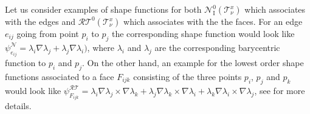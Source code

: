 \documentclass[a4paper,11pt]{article}
\begin{document}
 {Let us consider examples of shape functions for both $\mathcal N_\mathrm{I}^0(\mathcal T^x_\nu)$ which associates with the edges and $\mathcal{RT}^0(\mathcal T^x_\nu)$ which associates with the the faces. For an edge $e_{ij}$ going from point $p_i$ to $p_j$ the corresponding shape function would look like $\psi^{\mathcal{N}}_{e_{ij}} = \lambda_i\nabla \lambda_j+\lambda_j\nabla \lambda_i)$, where $\lambda_i$ and $\lambda_j$ are the corresponding barycentric function to $p_i$ and $p_j$. On the other hand, an example for the lowest order shape functions associated to a face $F_{ijk}$ consisting of the three points $p_i$, $p_j$ and $p_k$ would look like $\psi_{F_{ijk}}^{\mathcal{RT}}=\lambda_i\nabla \lambda_j\times \nabla \lambda_k +\lambda_j\nabla \lambda_k\times \nabla \lambda_i +\lambda_k\nabla \lambda_i\times \nabla \lambda_j $, see \cite[Section~14.1, Section~15.1]{ErnGuermond2020I} for more details.}
\end{document}
